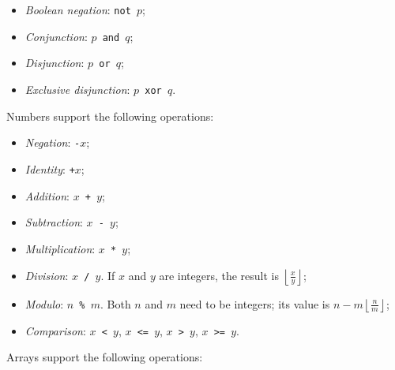 \documentclass[11pt, american, draft]{PhdThesis}
\begin{document}
  \begin{itemize}[noitemsep,topsep=0pt]
    \item \emph{Boolean negation}: \mbox{\texttt{not $p$}};
    \item \emph{Conjunction}: \mbox{\texttt{$p$ and $q$}};
    \item \emph{Disjunction}: \mbox{\texttt{$p$ or $q$}};
    \item \emph{Exclusive disjunction}: \mbox{\texttt{$p$ xor $q$}}.
  \end{itemize}

  Numbers support the following operations:

  \begin{itemize}[noitemsep,topsep=0pt]
    \item \emph{Negation}: \mbox{\texttt{-$x$}};

    \item \emph{Identity}: \mbox{\texttt{+$x$}};

    \item \emph{Addition}: \mbox{\texttt{$x$ + $y$}};

    \item \emph{Subtraction}: \mbox{\texttt{$x$ - $y$}};

    \item \emph{Multiplication}: \mbox{\texttt{$x$ * $y$}};

    \item \emph{Division}: \mbox{\texttt{$x$ / $y$}}. If $x$ and $y$ are integers, the result is
          \mbox{$\left\lfloor\frac{x}{y}\right\rfloor$};

    \item \emph{Modulo}: \mbox{\texttt{$n$ \% $m$}}. Both $n$ and $m$ need to be integers; its value
          is \mbox{$n - m \left\lfloor\frac{n}{m}\right\rfloor$};

    \item \emph{Comparison}: \mbox{\texttt{$x$ < $y$}}, \mbox{\texttt{$x$ <= $y$}},
          \mbox{\texttt{$x$ > $y$}}, \mbox{\texttt{$x$ >= $y$}}.
  \end{itemize}

  Arrays support the following operations:
\end{document}
